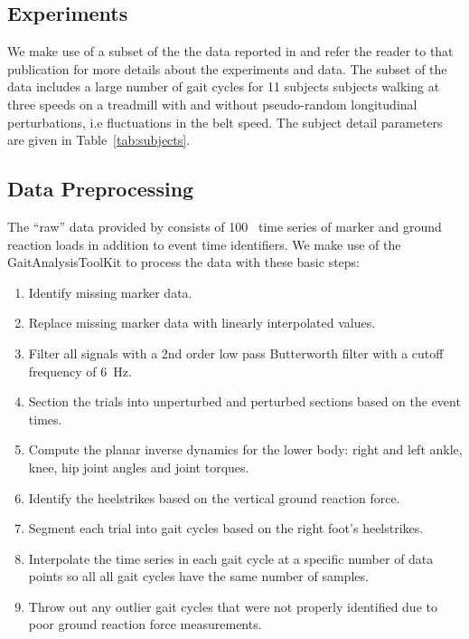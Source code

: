 \documentclass{article}
\begin{document}
\subsection*{Experiments}
%
We make use of a subset of the the data reported in \cite{Moore2015} and refer
the reader to that publication for more details about the experiments and data.
The subset of the data includes a large number of gait cycles for 11 subjects
subjects walking at three speeds on a treadmill with and without pseudo-random
longitudinal perturbations, i.e fluctuations in the belt speed. The subject
detail parameters are given in Table~\ref{tab:subjects}.
%
\begin{table}
  \cprotect\caption{Information about the 11 study participants. The final
    three columns provide the trial numbers associated with each nominal
    treadmill speed. The measured mass is computed from the mean total vertical
    ground reaction force just after the calibration pose event. Generated by
    \verb|src/subject_table.py|.}
  \centering
  
  \label{tab:subjects}
\end{table}

\subsection*{Data Preprocessing}
%
The ``raw'' data provided by \cite{Moore2015} consists of 100~\si{\hertx} time
series of marker and ground reaction loads in addition to event time
identifiers. We make use of the GaitAnalysisToolKit to process the data with
these basic steps:
%
\begin{enumerate}
  \item Identify missing marker data.
  \item Replace missing marker data with linearly interpolated values.
  \item Filter all signals with a 2nd order low pass Butterworth filter with a
    cutoff frequency of 6~\si{\hertz}.
  \item Section the trials into unperturbed and perturbed sections based on the
    event times.
  \item Compute the planar inverse dynamics for the lower body: right and left
    ankle, knee, hip joint angles and joint torques.
  \item Identify the heelstrikes based on the vertical ground reaction force.
  \item Segment each trial into gait cycles based on the right foot's
    heelstrikes.
  \item Interpolate the time series in each gait cycle at a specific number of
    data points so all all gait cycles have the same number of samples.
  \item Throw out any outlier gait cycles that were not properly identified due
    to poor ground reaction force measurements.
\end{enumerate}
\end{document}
